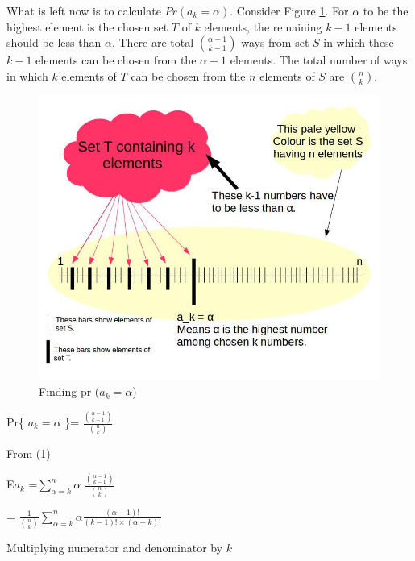 \documentclass{llncs}
\begin{document}
What is left now is to calculate $Pr(a_k=\alpha)$. Consider Figure \ref{ak}. For $\alpha$ to be the highest element is the chosen set $T$ of $k$ elements, the remaining $k-1$ elements should be less than $\alpha$. There are total $\binom{\alpha-1} {k-1}$ ways from set $S$ in which these $k-1$ elements can be chosen from the $\alpha - 1$ elements. The total number of ways in which $k$ elements of $T$ can be chosen from the $n$ elements of $S$ are $\binom {n} {k}$.
\begin{figure}[h!]
\centering
\includegraphics[width=\textwidth]{ak.jpg}
\caption{Finding pr ($a_k=\alpha$)}
\label{ak}
\end{figure}

\begin{center}
Pr\{ $a_k = \alpha $ \}= $\frac{ \binom {\alpha -1} {k-1} }{\binom {n} {k}}$\\
\end{center}

From (1)\\
\begin{center}
E\lbrack $a_k$ \rbrack=$ \sum_{\alpha=k}^n \alpha$
$\frac{ \binom {\alpha -1} {k-1} }{\binom {n} {k}}$
\end{center}

\begin{center}
= $ \frac{1}{\binom{n}{k}} \sum_{\alpha=k}^n \alpha  \frac{(\alpha -1)!} {(k-1)! \times (\alpha -k)!}$
\end{center}

Multiplying numerator and denominator by $k$ \\
\end{document}
